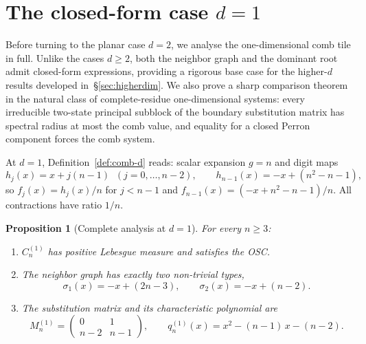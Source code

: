 \documentclass{amsart}
\newtheorem{proposition}[theorem]{Proposition}
\theoremstyle{definition}
\theoremstyle{remark}
\begin{document}
\section{The closed-form case \texorpdfstring{$d = 1$}{d = 1}}
\label{sec:d1}
\label{ssec:d1}

Before turning to the planar case $d = 2$, we analyse the
one-dimensional comb tile in full.  Unlike the cases $d \ge 2$,
both the neighbor graph and the dominant root admit closed-form
expressions, providing a rigorous base case for the higher-$d$
results developed in~\S\ref{sec:higherdim}.  We also prove a sharp
comparison theorem in the natural class of complete-residue
one-dimensional systems: every irreducible two-state principal subblock
of the boundary substitution matrix has spectral radius at most the
comb value, and equality for a closed Perron component forces the comb
system.

At $d = 1$, Definition~\ref{def:comb-d} reads: scalar
expansion $g = n$ and digit maps
\[
  h_j(x) = x + j(n{-}1) \;\; (j = 0, \ldots, n{-}2), \qquad
  h_{n-1}(x) = -x + (n^2{-}n{-}1),
\]
so $f_j(x) = h_j(x)/n$ for $j < n{-}1$ and
$f_{n-1}(x) = (-x + n^2{-}n{-}1)/n$.  All contractions have
ratio $1/n$.

\begin{proposition}[Complete analysis at $d=1$]\label{prop:d1}
For every $n \ge 3$:
\begin{enumerate}
\item $C_n^{(1)}$ has positive Lebesgue measure and satisfies
  the OSC.
\item The neighbor graph has exactly two non-trivial types,
  \[
    \sigma_1(x) = -x + (2n{-}3), \qquad
    \sigma_2(x) = -x + (n{-}2).
  \]
\item The substitution matrix and its characteristic polynomial are
  \begin{equation}\label{eq:d1-matrix}
    M_n^{(1)} =
    \begin{pmatrix} 0 & 1 \\ n{-}2 & n{-}1 \end{pmatrix},
    \qquad
    q_n^{(1)}(x) = x^2 - (n{-}1)\,x - (n{-}2).
  \end{equation}
\end{enumerate}
\end{proposition}
\end{document}
